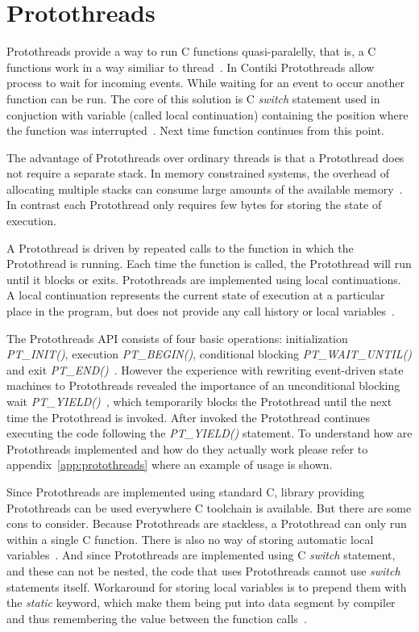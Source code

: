 
\section{Protothreads}\label{sec:contiki-protothreads}
Protothreads provide a way to run C functions quasi-paralelly,
that is, a C functions work in a way similiar to thread~\cite{paper-protothreads}.
In Contiki Protothreads allow process to wait for incoming events.
While waiting for an event to occur another function
can be run. The core of this solution is C {\it switch} statement used in conjuction with variable (called local continuation)
containing the position where the function was interrupted~\cite{paper-protothreads}.
Next time function continues from this point.

The advantage of Protothreads over ordinary threads is that a Protothread does not require a separate stack.
In memory constrained systems, the overhead of allocating multiple stacks can consume large amounts of
the available memory~\cite{paper-protothreads}.
In contrast each Protothread only requires few bytes for storing the state of execution.

A Protothread is driven by repeated calls to the function in which the Protothread is running.
Each time the function is called, the Protothread will run until it blocks or exits.
Protothreads are implemented using local continuations. A local continuation represents the current state
of execution at a particular place in the program, but does not provide any call history or local variables~\cite{contiki-docs}.

The Protothreads API consists of four basic operations: initialization {\it{PT\_INIT()}}, execution {\it{PT\_BEGIN()}},
conditional blocking {\it{PT\_WAIT\_UNTIL()}} and exit {\it{PT\_END()}}~\cite{paper-protothreads}.
However the experience with rewriting event-driven state machines to Protothreads revealed
the importance of an unconditional blocking wait {\it{PT\_YIELD()}}~\cite{thesis-programming},
which temporarily blocks the Protothread until the next time the Protothread is invoked.
After invoked the Protothread continues executing the code following the {\it{PT\_YIELD()}} statement.
To understand how are Protothreads implemented and how do they actually work please refer
to appendix~\ref{app:protothreads} where an example of usage is shown.

Since Protothreads are implemented using standard C, library providing Protothreads can be used everywhere C toolchain is available.
But there are some cons to consider. Because Protothreads are stackless, a Protothread can only run within a single C function.
There is also no way of storing automatic local variables~\cite{contiki-docs}.
And since Protothreads are implemented using C {\it switch} statement, and these can
not be nested, the code that uses Protothreads cannot use {\it switch} statements itself.
Workaround for storing local variables is to prepend them with the {\it static} keyword, which make them being put into data segment
by compiler and thus remembering the value between the function calls~\cite{paper-protothreads}.
